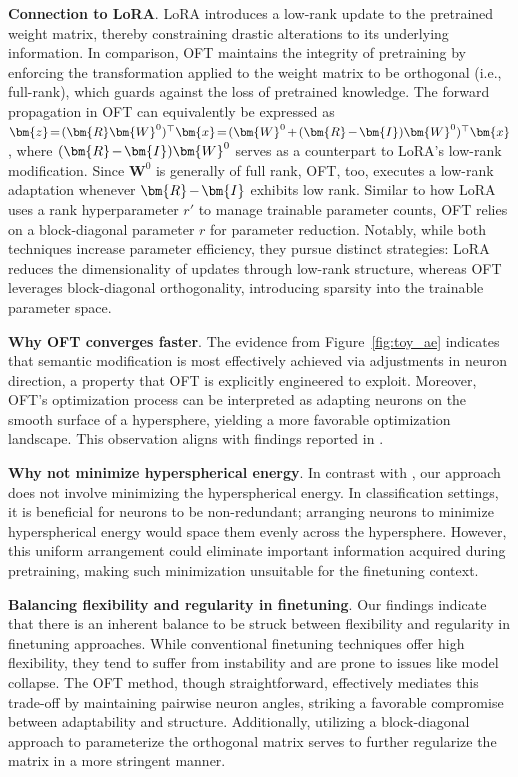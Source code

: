 \textbf{Connection to LoRA}. LoRA introduces a low-rank update to the pretrained weight matrix, thereby constraining drastic alterations to its underlying information. In comparison, OFT maintains the integrity of pretraining by enforcing the transformation applied to the weight matrix to be orthogonal (i.e., full-rank), which guards against the loss of pretrained knowledge. The forward propagation in OFT can equivalently be expressed as $\thickmuskip=2mu \medmuskip=2mu \bm{z}=(\bm{R}\bm{W}^0)^\top\bm{x}=(\bm{W}^0+(\bm{R}-\bm{I})\bm{W}^0)^\top\bm{x}$, where $\thickmuskip=2mu \medmuskip=2mu (\bm{R}-\bm{I})\bm{W}^0$ serves as a counterpart to LoRA’s low-rank modification. Since $\bm{W}^0$ is generally of full rank, OFT, too, executes a low-rank adaptation whenever $\thickmuskip=2mu \medmuskip=2mu \bm{R}-\bm{I}$ exhibits low rank. Similar to how LoRA uses a rank hyperparameter $r'$ to manage trainable parameter counts, OFT relies on a block-diagonal parameter $r$ for parameter reduction. Notably, while both techniques increase parameter efficiency, they pursue distinct strategies: LoRA reduces the dimensionality of updates through low-rank structure, whereas OFT leverages block-diagonal orthogonality, introducing sparsity into the trainable parameter space.

\textbf{Why OFT converges faster}. The evidence from Figure~\ref{fig:toy_ae} indicates that semantic modification is most effectively achieved via adjustments in neuron direction, a property that OFT is explicitly engineered to exploit. Moreover, OFT’s optimization process can be interpreted as adapting neurons on the smooth surface of a hypersphere, yielding a more favorable optimization landscape. This observation aligns with findings reported in \cite{liu2021orthogonal}.

\textbf{Why not minimize hyperspherical energy}. In contrast with \cite{liu2021orthogonal}, our approach does not involve minimizing the hyperspherical energy. In classification settings, it is beneficial for neurons to be non-redundant; arranging neurons to minimize hyperspherical energy would space them evenly across the hypersphere. However, this uniform arrangement could eliminate important information acquired during pretraining, making such minimization unsuitable for the finetuning context.

\textbf{Balancing flexibility and regularity in finetuning}. Our findings indicate that there is an inherent balance to be struck between flexibility and regularity in finetuning approaches. While conventional finetuning techniques offer high flexibility, they tend to suffer from instability and are prone to issues like model collapse. The OFT method, though straightforward, effectively mediates this trade-off by maintaining pairwise neuron angles, striking a favorable compromise between adaptability and structure. Additionally, utilizing a block-diagonal approach to parameterize the orthogonal matrix serves to further regularize the matrix in a more stringent manner.

